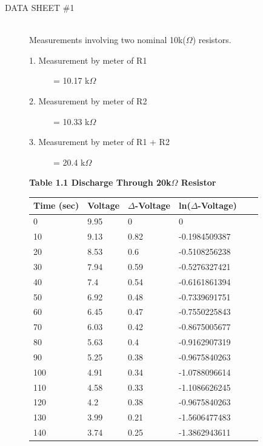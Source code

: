 \documentclass{article}
\begin{document}
\begin{description}

\item[DATA SHEET \#1] \hfill \\
Measurements involving two nominal 10k($\Omega$) resistors.\
\begin{description}
\item[1. Measurement by meter of R1] = 10.17 k$\Omega$  \
\item[2. Measurement by meter of R2] = 10.33 k$\Omega$  \
\item[3. Measurement by meter of R1 + R2] = 20.4 k$\Omega$  \\
\end{description}
\begin{samepage}
\textbf{Table 1.1 Discharge Through 20k$\Omega$ Resistor } \
{\small{
\begin{center}
	\begin{tabular}{| l | l | l | l | l | l | }
	\hline
Time (sec) & Voltage &  $\Delta$-Voltage & ln($\Delta$-Voltage) \\ \hline
0	&	9.95	&	0	&	0	\\	\hline
10	&	9.13	&	0.82	&	-0.1984509387	\\	\hline
20	&	8.53	&	0.6	&	-0.5108256238	\\	\hline
30	&	7.94	&	0.59	&	-0.5276327421	\\	\hline
40	&	7.4	&	0.54	&	-0.6161861394	\\	\hline
50	&	6.92	&	0.48	&	-0.7339691751	\\	\hline
60	&	6.45	&	0.47	&	-0.7550225843	\\	\hline
70	&	6.03	&	0.42	&	-0.8675005677	\\	\hline
80	&	5.63	&	0.4	&	-0.9162907319	\\	\hline
90	&	5.25	&	0.38	&	-0.9675840263	\\	\hline
100	&	4.91	&	0.34	&	-1.0788096614	\\	\hline
110	&	4.58	&	0.33	&	-1.1086626245	\\	\hline
120	&	4.2	&	0.38	&	-0.9675840263	\\	\hline
130	&	3.99	&	0.21	&	-1.5606477483	\\	\hline
140	&	3.74	&	0.25	&	-1.3862943611	\\	\hline




\end{tabular}
\end{center}}}
\end{samepage}
\end{description}
\end{document}
